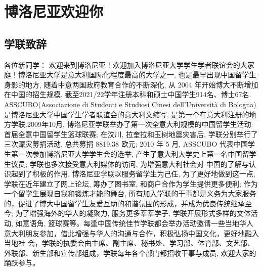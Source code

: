
% 


\chapter{博洛尼亚欢迎你}                 %

\section{学联致辞}

各位新同学：
欢迎来到博洛尼亚！欢迎加入博洛尼亚大学学生学者联谊会的大家庭！博洛尼亚大学是意大利国际化程度最高的大学之一, 也是最早出现中国留学生身影的地方, 随着中意两国政府教育合作的不断深化, 从 2004 年开始博大不断增加在中国的招生规模, 截至2021/22学年注册本科和硕士中国学生914名、博士67名. ASSCUBO(Associazione di Studenti e Studiosi Cinesi dell’Università di Bologna) 是博洛尼亚大学中国学生学者联谊会的意大利文缩写, 是第一个在意大利注册的地方学联.2009年10月, 博洛尼亚学联举办了第一次全意大利规模的中国留学生活动: 首届全意中国留学生篮球联赛; 在汶川, 拉奎拉和玉树地震灾害后, 学联分别举行了三次赈灾募捐活动, 总共募捐 8819.38 欧元; 2010 年 5 月, ASSCUBO 代表中国学生第一次参加博洛尼亚大学学生会的选举, 产生了意大利大学史上第一名中国留学生议员; 学联也多次接受意大利媒体的访问, 为增强意大利社会对 中国的了解与认识起到了积极的作用. 博洛尼亚学联以服务留学生为己任, 为了更好地做到这一点, 学联在近年建立了网上论坛, 筹办了图书室, 和商户合作为学生提供更多便利; 作为一个留学生展现自我和锻炼才能的舞台, 所有加入学联的干事都是义务为大家服务的，促进了博大中国留学生友爱互助的和谐氛围的形成，并成为优良传统继承至今; 为了增强海外的华人的凝聚力, 服务更多莘莘学子, 学联开展形式多样的文体活动, 如意语角, 篮球赛等。每逢中国传统佳节学联都会举办活动邀请一些当地华人意大利朋友参加，借此增强与华人的沟通与合作，积极弘扬中国文化，更好地融入当地社 会，学联的执委会由主席、副主席、秘书处、学习部、体育部、文艺部、外联部、新生部和宣传部组成，学联每年各个部门都招收干事与成员, 欢迎大家的踊跃参与。 



